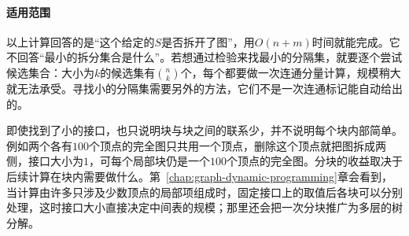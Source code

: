 \paragraph{适用范围}
以上计算回答的是“这个给定的$S$是否拆开了图”，用$O(n+m)$时间就能完成。它不回答“最小的拆分集合是什么”。若想通过检验来找最小的分隔集，就要逐个尝试候选集合：大小为$k$的候选集有$\binom{n}{k}$个，每个都要做一次连通分量计算，规模稍大就无法承受。寻找小的分隔集需要另外的方法，它们不是一次连通标记能自动给出的。

即使找到了小的接口，也只说明块与块之间的联系少，并不说明每个块内部简单。例如两个各有$100$个顶点的完全图只共用一个顶点，删除这个顶点就把图拆成两侧，接口大小为$1$，可每个局部块仍是一个$100$个顶点的完全图。分块的收益取决于后续计算在块内需要做什么。第~\ref{chap:graph-dynamic-programming}章会看到，当计算由许多只涉及少数顶点的局部项组成时，固定接口上的取值后各块可以分别处理，这时接口大小直接决定中间表的规模；那里还会把一次分块推广为多层的树分解。
